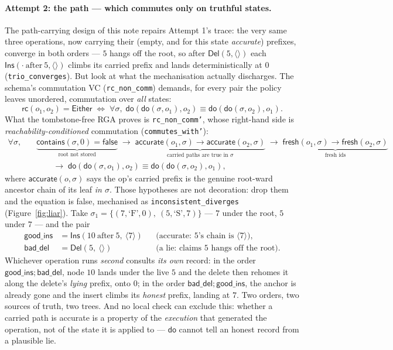 \documentclass[11pt]{article}
\newcommand{\rc}{\mathsf{rc}}
\newcommand{\doo}{\mathsf{do}}
\newcommand{\Ins}{\mathsf{Ins}}
\newcommand{\Del}{\mathsf{Del}}
\newcommand{\Either}{\mathsf{Either}}
\newcommand{\contains}{\mathsf{contains}}
\begin{document}
\paragraph{Attempt 2: the path --- which commutes only on truthful states.}
The path-carrying design of this note repairs Attempt 1's trace: the very same
three operations, now carrying their (empty, and for this state \emph{accurate})
prefixes, converge in both orders --- $5$ hangs off the root, so after
$\Del(5, \langle\rangle)$ each $\Ins(\cdot\ \text{after}\ 5, \langle\rangle)$
climbs its carried prefix and lands deterministically at $0$
(\texttt{trio\_converges}). But look at what the mechanisation actually
discharges. The schema's commutation VC (\texttt{rc\_non\_comm}) demands, for
every pair the policy leaves unordered, commutation over \emph{all} states:
\[
  \rc(o_1,o_2) = \Either
  \;\iff\;
  \forall \sigma,\;
  \doo(\doo(\sigma,o_1),o_2) \equiv \doo(\doo(\sigma,o_2),o_1).
\]
What the tombstone-free RGA proves is \texttt{rc\_non\_comm'}, whose
right-hand side is \emph{reachability-conditioned} commutation
(\texttt{commutes\_with'}):
\[
\begin{aligned}
  \forall \sigma,\quad
  &\underbrace{\contains(\sigma,0)=\mathsf{false}}_{\text{root not stored}}
  \;\to\;
  \underbrace{\mathsf{accurate}(o_1,\sigma) \to \mathsf{accurate}(o_2,\sigma)}_{\text{carried paths are true in }\sigma}
  \;\to\;
  \underbrace{\mathsf{fresh}(o_1,\sigma) \to \mathsf{fresh}(o_2,\sigma)}_{\text{fresh ids}}\\
  &\qquad\to\;
  \doo(\doo(\sigma,o_1),o_2) \equiv \doo(\doo(\sigma,o_2),o_1),
\end{aligned}
\]
where $\mathsf{accurate}(o,\sigma)$ says the op's carried prefix is the genuine
root-ward ancestor chain of its leaf \emph{in $\sigma$}. Those hypotheses are
not decoration: drop them and the equation is false, mechanised as
\texttt{inconsistent\_diverges} (Figure~\ref{fig:liar}). Take
$\sigma_1 = \{(7, \text{`F'}, 0),\ (5, \text{`S'}, 7)\}$ --- $7$ under the
root, $5$ under $7$ --- and the pair
\[
\begin{aligned}
  \mathsf{good\_ins} &= \Ins(10\ \text{after}\ 5,\ \langle 7\rangle)
  &&\text{(accurate: $5$'s chain is $\langle 7 \rangle$)},\\
  \mathsf{bad\_del} &= \Del(5,\ \langle\rangle)
  &&\text{(a lie: claims $5$ hangs off the root)}.
\end{aligned}
\]
Whichever operation runs \emph{second} consults \emph{its own} record: in the
order $\mathsf{good\_ins} ; \mathsf{bad\_del}$, node $10$ lands under the live
$5$ and the delete then rehomes it along the delete's \emph{lying} prefix, onto
$0$; in the order $\mathsf{bad\_del} ; \mathsf{good\_ins}$, the anchor is
already gone and the insert climbs its \emph{honest} prefix, landing at $7$.
Two orders, two sources of truth, two trees. And no local check can exclude
this: whether a carried path is accurate is a property of the \emph{execution}
that generated the operation, not of the state it is applied to --- $\doo$
cannot tell an honest record from a plausible lie.
\end{document}
